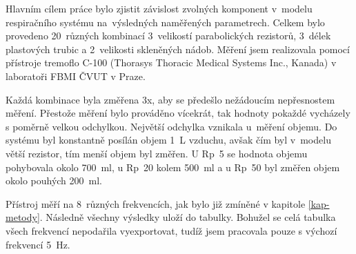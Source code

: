Hlavním cílem práce bylo zjistit závislost zvolných komponent v~modelu respiračního systému na~výsledných naměřených parametrech.  Celkem bylo provedeno 20~různých kombinací 3~velikostí parabolických rezistorů, 3~délek plastových trubic a 2~velikosti skleněných nádob. Měření jsem realizovala pomocí přístroje tremoflo C-100 (Thorasys Thoracic Medical Systems Inc., Kanada) v laboratoři FBMI ČVUT v Praze. 

Každá kombinace byla změřena 3x, aby se předešlo nežádoucím nepřesnostem měření. Přestože měření bylo prováděno vícekrát, tak hodnoty pokaždé vycházely s poměrně velkou odchylkou. Největší odchylka vznikala u~měření objemu. Do systému byl konstantně posílán objem \SI{1}{L} vzduchu, avšak čím byl v~modelu větší rezistor,  tím menší objem byl změřen. U Rp~5 se hodnota objemu pohybovala okolo  \SI{700}{ml}, u Rp~20 kolem  \SI{500}{ml} a u Rp~50 byl změřen objem okolo pouhých \SI{200}{ml}.

Přístroj měří na 8~různých frekvencích, jak bylo již zmíněné v kapitole \ref{kap-metody}. Následně všechny výsledky uloží do tabulky. Bohužel se  celá tabulka všech frekvencí nepodařila vyexportovat, tudíž jsem pracovala pouze s výchozí frekvencí  \SI{5}{Hz}. 
